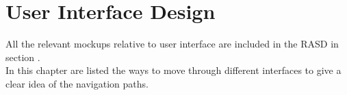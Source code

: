 \documentclass[../DD.tex]{subfiles}
\begin{document}
 \chapter{User Interface Design}
	All the relevant mockups relative to user interface are included in the RASD in section .\\
	In this chapter are listed the ways to move through different interfaces to give a clear idea of the navigation paths.
\thispagestyle{fancy}
 
\end{document}
